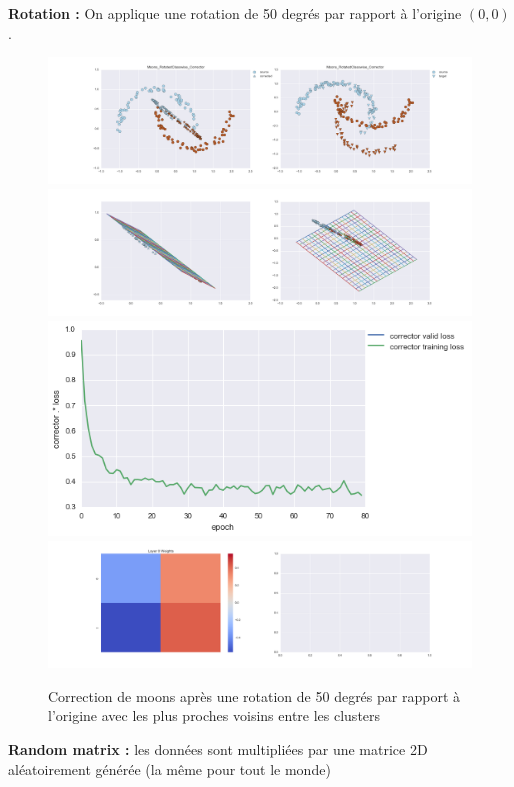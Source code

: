 {\Large \textbf{Rotation :}} On applique une rotation de 50 degrés par rapport à l'origine $(0,0)$.

\begin{figure}[H] %
\centering
\includegraphics[width=\linewidth]{fig/24-05-2016/moons/Moons_RotatedClasswise_Corrector-DATA.png}
\includegraphics[width=\linewidth]{fig/24-05-2016/moons/Moons_RotatedClasswise_Corrector-GridCheck.png}
\includegraphics[width=0.45\linewidth]{fig/24-05-2016/moons/Moons_RotatedClasswise_Corrector-Learning_curve.png}
\includegraphics[width=\linewidth]{fig/24-05-2016/moons/Moons_RotatedClasswise_Corrector-W.png}
\caption{Correction de moons après une rotation de 50 degrés par rapport à l'origine avec les plus proches voisins entre les clusters}
\label{fig:recap-moons-rot-classwise}
\end{figure}

{\Large \textbf{Random matrix :}} les données sont multipliées par une matrice 2D aléatoirement générée
 (la même pour tout le monde)

